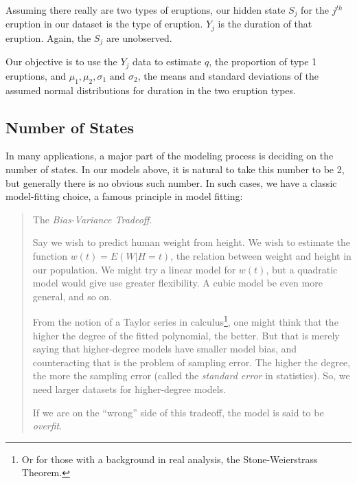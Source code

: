\documentclass[11pt]{article}
\begin{document}
Assuming there really are two types of eruptions, our hidden state $S_j$
for the $j^{th}$ eruption in our dataset is the type of eruption.  $Y_j$
is the duration of that eruption.  Again, the $S_j$ are unobserved.

Our objective is to use the $Y_j$ data to estimate $q$, the proportion
of type 1 eruptions, and
$
\mu_1,
\mu_2,
\sigma_1 
\textrm{ and }
\sigma_2 
$, the means and standard deviations of the assumed normal distributions
for duration in the two eruption types.

% 
% 

\subsection{Number of States}

In many applications, a major part of the modeling process is deciding
on the number of states.  In our models above, it is natural to take
this number to be 2, but generally there is no obvious such number.  In
such cases, we have a classic model-fitting choice, a famous principle
in model fitting:

\begin{quote}

The \textit{Bias-Variance Tradeoff}.  

Say we wish to predict human weight from height.  We wish to estimate
the function $w(t) = E(W | H = t)$, the relation between weight and
height in our population.  We might try a linear model for $w(t)$, but a
quadratic model would give use greater flexibility.  A cubic model be
even more general, and so on.

From the notion of a Taylor series in calculus\footnote{Or for those
with a background in real analysis, the Stone-Weierstrass Theorem.},
one might think that the higher the degree of the fitted polynomial, the
better.  But that is merely saying that higher-degree models have
smaller model bias, and counteracting that is the problem of sampling
error.  The higher the degree, the more the sampling error (called the
\textit{standard error} in statistics).  So, we need larger datasets
for higher-degree models.

If we are on the ``wrong'' side of this tradeoff, the model is said to
be \textit{overfit}.

\end{quote}
\end{document}
